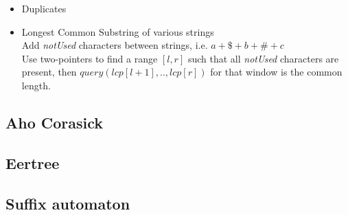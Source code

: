 \begin{itemize}[noitemsep]
  \item Duplicates 

  \item Longest Common Substring of various strings \\
  Add \emph{notUsed} characters between strings, i.e. $a + \$ + b + \# + c$ \\ 
  Use two-pointers to find a range $[l, r]$ such that all \emph{notUsed} characters are present, then $query(lcp[l + 1],..,lcp[r])$ for that window is the common length. \\

\end{itemize}

\subsection{Aho Corasick }


\subsection{Eertree }


\subsection{Suffix automaton }

\vspace{-5pt}

